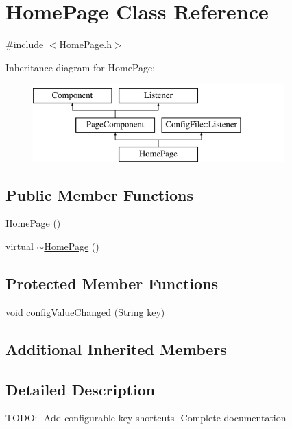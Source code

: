 \hypertarget{classHomePage}{}\section{Home\+Page Class Reference}
\label{classHomePage}


{\ttfamily \#include $<$Home\+Page.\+h$>$}

Inheritance diagram for Home\+Page\+:\begin{figure}[H]
\begin{center}
\leavevmode
\includegraphics[height=3.000000cm]{classHomePage}
\end{center}
\end{figure}
\subsection*{Public Member Functions}
\begin{DoxyCompactItemize}
\item 
\mbox{\hyperlink{classHomePage_a49bf8e72132243658f2f193e8ac2333b}{Home\+Page}} ()
\item 
virtual \mbox{\hyperlink{classHomePage_a3e4706d65665ce5118f38936a957c9d3}{$\sim$\+Home\+Page}} ()
\end{DoxyCompactItemize}
\subsection*{Protected Member Functions}
\begin{DoxyCompactItemize}
\item 
void \mbox{\hyperlink{classHomePage_a06ddd5a30efb7eb20cb4186a63d4dbbb}{config\+Value\+Changed}} (String key)
\end{DoxyCompactItemize}
\subsection*{Additional Inherited Members}


\subsection{Detailed Description}
T\+O\+DO\+: -\/\+Add configurable key shortcuts -\/\+Complete documentation 

